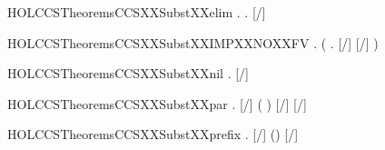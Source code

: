 \newcommand{\HOLCCSTheoremsCCSXXdistinctXXexists}{\UseVerbatim{HOLCCSTheoremsCCSXXdistinctXXexists}}
\begin{SaveVerbatim}{HOLCCSTheoremsCCSXXSubstXXelim}
\HOLTokenTurnstile{} \HOLSymConst{\HOLTokenForall{}} .  \HOLConst{\HOLTokenNotIn{}}   \HOLSymConst{\HOLTokenEquiv{}} \HOLSymConst{\HOLTokenForall{}}. [/]  \HOLSymConst{=} 
\end{SaveVerbatim}
\newcommand{\HOLCCSTheoremsCCSXXSubstXXelim}{\UseVerbatim{HOLCCSTheoremsCCSXXSubstXXelim}}
\begin{SaveVerbatim}{HOLCCSTheoremsCCSXXSubstXXIMPXXNOXXFV}
\HOLTokenTurnstile{} \HOLSymConst{\HOLTokenForall{}} . (\HOLSymConst{\HOLTokenForall{}} . [/]  \HOLSymConst{=} [/] ) \HOLSymConst{\HOLTokenImp{}}  \HOLConst{\HOLTokenNotIn{}}  
\end{SaveVerbatim}
\newcommand{\HOLCCSTheoremsCCSXXSubstXXIMPXXNOXXFV}{\UseVerbatim{HOLCCSTheoremsCCSXXSubstXXIMPXXNOXXFV}}
\begin{SaveVerbatim}{HOLCCSTheoremsCCSXXSubstXXnil}
\HOLTokenTurnstile{} \HOLSymConst{\HOLTokenForall{}} . [/]  \HOLSymConst{=} 
\end{SaveVerbatim}
\newcommand{\HOLCCSTheoremsCCSXXSubstXXnil}{\UseVerbatim{HOLCCSTheoremsCCSXXSubstXXnil}}
\begin{SaveVerbatim}{HOLCCSTheoremsCCSXXSubstXXpar}
\HOLTokenTurnstile{} \HOLSymConst{\HOLTokenForall{}}   . [/] ( \HOLSymConst{\ensuremath{\parallel}} ) \HOLSymConst{=} [/]  \HOLSymConst{\ensuremath{\parallel}} [/] 
\end{SaveVerbatim}
\newcommand{\HOLCCSTheoremsCCSXXSubstXXpar}{\UseVerbatim{HOLCCSTheoremsCCSXXSubstXXpar}}
\begin{SaveVerbatim}{HOLCCSTheoremsCCSXXSubstXXprefix}
\HOLTokenTurnstile{} \HOLSymConst{\HOLTokenForall{}}   . [/] () \HOLSymConst{=} [/] 
\end{SaveVerbatim}
